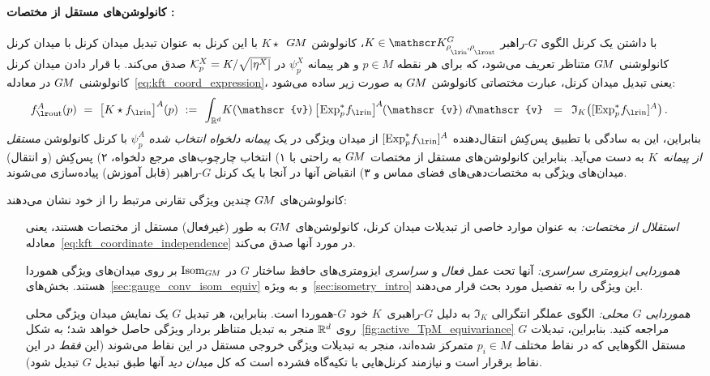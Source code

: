 \paragraph{کانولوشن‌های مستقل از مختصات \textit{}:}

با داشتن یک کرنل الگوی $G$-راهبر $K\in\KG$، کانولوشن $G\mkern-1.4muM$~$K\star$ با این کرنل به عنوان تبدیل میدان کرنل با میدان کرنل کانولوشنی $G\mkern-1.4muM$ متناظر تعریف می‌شود، که برای هر نقطه $p\in M$ و هر پیمانه $\psi_p^X$ در $\mathcal{K}_p^X = K / \sqrt{|\eta^X|}$ صدق می‌کند.
با قرار دادن میدان کرنل کانولوشنی $G\mkern-1.4muM$ در معادله~\eqref{eq:kft_coord_expression}، یعنی تبدیل میدان کرنل، عبارت مختصاتی کانولوشن $G\mkern-1.4muM$ به صورت زیر ساده می‌شود:
\begin{align}\label{eq:gauge_conv_coord_expression}
	\fout^A(p)
	\ =\ 
	\big[ K \star \fin \big]^A(p)
	\ :=&\,\ 
	\int_{\R^d} \!
	K(\mathscr{v}) \,
	\big[\mkern-2mu \Expspfin\big]^{\mkern-2mu A} \mkern-1mu(\mathscr{v})
	\; d\mathscr{v}
	\ \ =\,\ \mathfrak{I}_K \big( [\Expspfin]^A \big)
	\,.
\end{align}
بنابراین، این به سادگی با تطبیق پس‌کِش انتقال‌دهنده $[\Expspfin]^A$ از میدان ویژگی در یک \emph{پیمانه دلخواه انتخاب شده} $\psi_p^A$ با کرنل کانولوشن \emph{مستقل از پیمانه}~$K$ به دست می‌آید.
بنابراین کانولوشن‌های مستقل از مختصات $G\mkern-1.4muM$ به راحتی با
۱) انتخاب چارچوب‌های مرجع دلخواه،
۲) پس‌کِش (و انتقال) میدان‌های ویژگی به مختصات‌دهی‌های فضای مماس و
۳) انقباض آنها در آنجا با یک کرنل $G$-راهبر (قابل آموزش) پیاده‌سازی می‌شوند.

کانولوشن‌های $G\mkern-1.4muM$ چندین ویژگی تقارنی مرتبط را از خود نشان می‌دهند:
\begin{itemize}[leftmargin=13em]
	\item[\it استقلال از مختصات:]
	به عنوان موارد خاصی از تبدیلات میدان کرنل، کانولوشن‌های $G\mkern-1.4muM$ به طور (غیرفعال) مستقل از مختصات هستند، یعنی معادله~\eqref{eq:kft_coordinate_independence} در مورد آنها صدق می‌کند.
	\item[\it هموردایی ایزومتری سراسری:]
	آنها تحت عمل \emph{فعال} و \emph{سراسری} ایزومتری‌های حافظ ساختار $G$ در $\operatorname{Isom}_{G\mkern-1.4muM}$ بر روی میدان‌های ویژگی هموردا هستند.
	بخش‌های~\ref{sec:gauge_conv_isom_equiv} و به ویژه~\ref{sec:isometry_intro} این ویژگی را به تفصیل مورد بحث قرار می‌دهند.
	\item[\it هموردایی $G$ محلی:]
	الگوی عملگر انتگرالی $\mathfrak{I}_K$ به دلیل $G$-راهبری~$K$ خود $G$-هموردا است.
	بنابراین، هر تبدیل $G$ یک نمایش میدان ویژگی محلی روی $\mathbb{R}^d$ منجر به تبدیل متناظر بردار ویژگی حاصل خواهد شد؛ به شکل~\ref{fig:active_TpM_equivariance} مراجعه کنید.
	بنابراین، تبدیلات $G$ مستقل الگوهایی که در نقاط مختلف $p_i\in M$ متمرکز شده‌اند، منجر به تبدیلات ویژگی خروجی مستقل در این نقاط می‌شوند (این \emph{فقط} در این نقاط برقرار است و نیازمند کرنل‌هایی با تکیه‌گاه فشرده است که کل \emph{میدان دید} آنها طبق تبدیل $G$ تبدیل شود).
\end{itemize}

